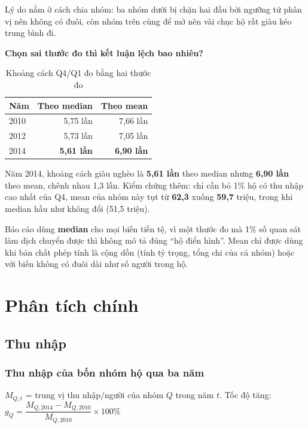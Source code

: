 \documentclass[11pt,a4paper]{article}
\newcommand{\n}[1]{\textbf{#1}}
\begin{document}
Lý do nằm ở cách chia nhóm: ba nhóm dưới bị chặn hai đầu bởi ngưỡng tứ phân vị nên không có đuôi, còn nhóm trên cùng để mở nên vài chục hộ rất giàu kéo trung bình đi.

\textbf{Chọn sai thước đo thì kết luận lệch bao nhiêu?}

\begin{table}[H]\centering\small
\caption{Khoảng cách Q4/Q1 đo bằng hai thước đo}
\begin{tabular}{lrr}
\toprule
Năm & Theo median & Theo mean\\
\midrule
2010 & 5,75 lần & 7,66 lần\\
2012 & 5,73 lần & 7,05 lần\\
2014 & \textbf{5,61 lần} & \textbf{6,90 lần}\\
\bottomrule
\end{tabular}
\end{table}

Năm 2014, khoảng cách giàu nghèo là \n{5,61 lần} theo median nhưng \n{6,90 lần} theo mean, chênh nhau 1,3 lần. Kiểm chứng thêm: chỉ cần bỏ 1\% hộ có thu nhập cao nhất của Q4, mean của nhóm này tụt từ \n{62,3} xuống \n{59,7} triệu, trong khi median hầu như không đổi (51,5 triệu).

\begin{kl}
Báo cáo dùng \n{median} cho mọi biến tiền tệ, vì một thước đo mà 1\% số quan sát làm dịch chuyển được thì không mô tả đúng “hộ điển hình”. Mean chỉ được dùng khi bản chất phép tính là cộng dồn (tính tỷ trọng, tổng chi của cả nhóm) hoặc với biến không có đuôi dài như số người trong hộ.
\end{kl}

\section{Phân tích chính}

\subsection{Thu nhập}

\subsubsection{Thu nhập của bốn nhóm hộ qua ba năm}

\begin{ct}
$M_{Q,t}$ = trung vị thu nhập/người của nhóm $Q$ trong năm $t$. \quad
Tốc độ tăng: \quad $g_Q = \dfrac{M_{Q,2014}-M_{Q,2010}}{M_{Q,2010}} \times 100\%$
\end{ct}
\end{document}
